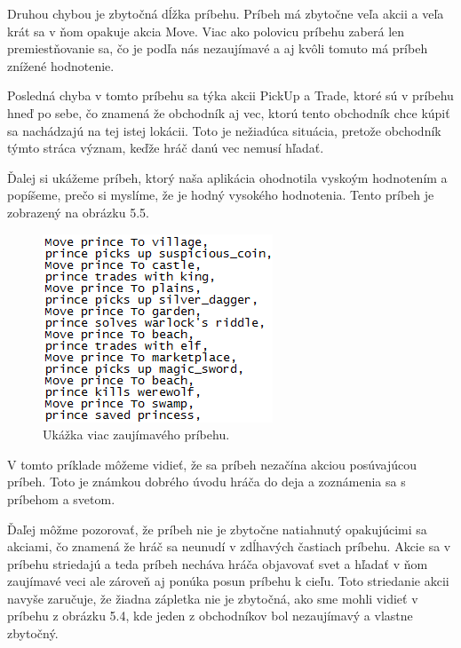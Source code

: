 Druhou chybou je zbytočná dĺžka príbehu. Príbeh má zbytočne veľa akcii a veľa krát sa v ňom opakuje akcia Move. Viac ako polovicu príbehu zaberá len premiestňovanie sa, čo je podľa nás nezaujímavé a aj kvôli tomuto má príbeh znížené hodnotenie.\par
Posledná chyba v tomto príbehu sa týka akcii PickUp a Trade, ktoré sú v príbehu hneď po sebe, čo znamená že obchodník aj vec, ktorú tento obchodník chce kúpiť sa nachádzajú na tej istej lokácii. Toto je nežiadúca situácia, pretože obchodník týmto stráca význam, keďže hráč danú vec nemusí hľadať.\par
Ďalej si ukážeme príbeh, ktorý naša aplikácia ohodnotila vyskoým hodnotením a popíšeme, prečo si myslíme, že je hodný vysokého hodnotenia. Tento príbeh je zobrazený na obrázku 5.5.
\begin{figure}[H] 
\begin{center}
\includegraphics[scale=1.0]{img/dobry_pribeh.png}
\caption{Ukážka viac zaujímavého príbehu.}
\label{fig:ch55}
\end{center}
\end{figure}
V tomto príklade môžeme vidieť, že sa príbeh nezačína akciou posúvajúcou príbeh. Toto je známkou dobrého úvodu hráča do deja a zoznámenia sa s príbehom a svetom.\par
Ďaľej môžme pozorovať, že príbeh nie je zbytočne natiahnutý opakujúcimi sa akciami, čo znamená že hráč sa neunudí v zdĺhavých častiach príbehu. Akcie sa v príbehu striedajú a teda príbeh necháva hráča objavovať svet a hľadať v ňom zaujímavé veci ale zároveň aj ponúka posun príbehu k cieľu. Toto striedanie akcii navyše zaručuje, že žiadna zápletka nie je zbytočná, ako sme mohli vidieť v príbehu z obrázku 5.4, kde jeden z obchodníkov bol nezaujímavý a vlastne zbytočný.\par